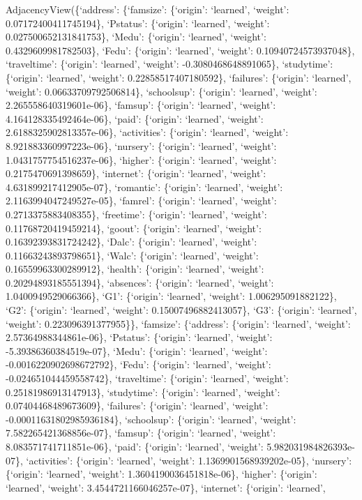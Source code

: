 \documentclass[
]{article}
\begin{document}
AdjacencyView(\{`address': \{`famsize': \{`origin': `learned', `weight':
0.07172400411745194\}, `Pstatus': \{`origin': `learned', `weight':
0.027500652131841753\}, `Medu': \{`origin': `learned', `weight':
0.4329609981782503\}, `Fedu': \{`origin': `learned', `weight':
0.10940724573937048\}, `traveltime': \{`origin': `learned', `weight':
-0.3080468648891065\}, `studytime': \{`origin': `learned', `weight':
0.22858517407180592\}, `failures': \{`origin': `learned', `weight':
0.06633709792506814\}, `schoolsup': \{`origin': `learned', `weight':
2.265558640319601e-06\}, `famsup': \{`origin': `learned', `weight':
4.164128335492464e-06\}, `paid': \{`origin': `learned', `weight':
2.6188325902813357e-06\}, `activities': \{`origin': `learned', `weight':
8.921883360997223e-06\}, `nursery': \{`origin': `learned', `weight':
1.0431757754516237e-06\}, `higher': \{`origin': `learned', `weight':
0.2175470691398659\}, `internet': \{`origin': `learned', `weight':
4.631899217412905e-07\}, `romantic': \{`origin': `learned', `weight':
2.1163994047249527e-05\}, `famrel': \{`origin': `learned', `weight':
0.2713375883408355\}, `freetime': \{`origin': `learned', `weight':
0.11768720419459214\}, `goout': \{`origin': `learned', `weight':
0.16392393831724242\}, `Dalc': \{`origin': `learned', `weight':
0.11663243893798651\}, `Walc': \{`origin': `learned', `weight':
0.16559963300289912\}, `health': \{`origin': `learned', `weight':
0.20294893185551394\}, `absences': \{`origin': `learned', `weight':
1.0400949529066366\}, `G1': \{`origin': `learned', `weight':
1.006295091882122\}, `G2': \{`origin': `learned', `weight':
0.15007496882413057\}, `G3': \{`origin': `learned', `weight':
0.223096391377955\}\}, `famsize': \{`address': \{`origin': `learned',
`weight': 2.57364988344861e-06\}, `Pstatus': \{`origin': `learned',
`weight': -5.39386360384519e-07\}, `Medu': \{`origin': `learned',
`weight': -0.0016220902698672792\}, `Fedu': \{`origin': `learned',
`weight': -0.024651044459558742\}, `traveltime': \{`origin': `learned',
`weight': 0.25181986913147913\}, `studytime': \{`origin': `learned',
`weight': 0.07404468489673609\}, `failures': \{`origin': `learned',
`weight': -0.00011631802985936184\}, `schoolsup': \{`origin': `learned',
`weight': 7.582265421368856e-07\}, `famsup': \{`origin': `learned',
`weight': 8.083571741711851e-06\}, `paid': \{`origin': `learned',
`weight': 5.982031984826393e-07\}, `activities': \{`origin': `learned',
`weight': 1.1369901568939202e-05\}, `nursery': \{`origin': `learned',
`weight': 1.3604190036451818e-06\}, `higher': \{`origin': `learned',
`weight': 3.4544721166046257e-07\}, `internet': \{`origin': `learned',
\end{document}
